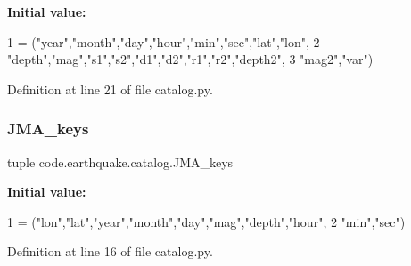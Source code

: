 {\bfseries Initial value\+:}
\begin{DoxyCode}
1 =  (\textcolor{stringliteral}{"year"},\textcolor{stringliteral}{"month"},\textcolor{stringliteral}{"day"},\textcolor{stringliteral}{"hour"},\textcolor{stringliteral}{"min"},\textcolor{stringliteral}{"sec"},\textcolor{stringliteral}{"lat"},\textcolor{stringliteral}{"lon"},
2              \textcolor{stringliteral}{"depth"},\textcolor{stringliteral}{"mag"},\textcolor{stringliteral}{"s1"},\textcolor{stringliteral}{"s2"},\textcolor{stringliteral}{"d1"},\textcolor{stringliteral}{"d2"},\textcolor{stringliteral}{"r1"},\textcolor{stringliteral}{"r2"},\textcolor{stringliteral}{"depth2"},
3              \textcolor{stringliteral}{"mag2"},\textcolor{stringliteral}{"var"})
\end{DoxyCode}


Definition at line 21 of file catalog.\+py.

\mbox{\label{namespacecode_1_1earthquake_1_1catalog_a44170f2ae9a3da309e934ece234c1294}} 
\subsubsection{\texorpdfstring{J\+M\+A\+\_\+keys}{JMA\_keys}}
{\footnotesize\ttfamily tuple code.\+earthquake.\+catalog.\+J\+M\+A\+\_\+keys}

{\bfseries Initial value\+:}
\begin{DoxyCode}
1 =  (\textcolor{stringliteral}{"lon"},\textcolor{stringliteral}{"lat"},\textcolor{stringliteral}{"year"},\textcolor{stringliteral}{"month"},\textcolor{stringliteral}{"day"},\textcolor{stringliteral}{"mag"},\textcolor{stringliteral}{"depth"},\textcolor{stringliteral}{"hour"},
2             \textcolor{stringliteral}{"min"},\textcolor{stringliteral}{"sec"})
\end{DoxyCode}


Definition at line 16 of file catalog.\+py.

\mbox{\label{namespacecode_1_1earthquake_1_1catalog_ac679c311493ec4df9d1d045a572b10d8}} 
